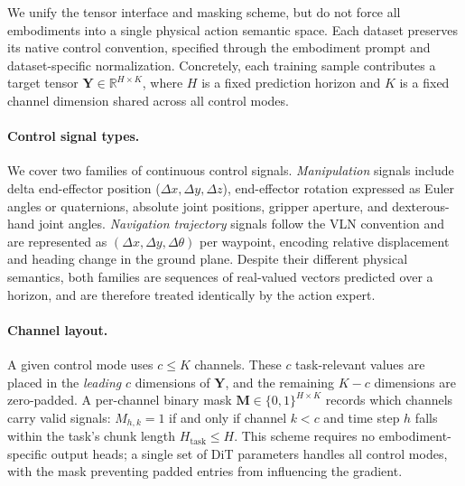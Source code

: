 We unify the tensor interface and masking scheme, but do not force all embodiments into a single physical action semantic space. Each dataset preserves its native control convention, specified through the embodiment prompt and dataset-specific normalization.
Concretely, each training sample contributes a target tensor $\mathbf{Y} \in \mathbb{R}^{H \times K}$, where $H$ is a fixed prediction horizon and $K$ is a fixed channel dimension shared across all control modes.


\paragraph{Control signal types.}
We cover two families of continuous control signals.
\textit{Manipulation} signals include delta end-effector position ($\Delta x, \Delta y, \Delta z$), end-effector rotation expressed as Euler angles or quaternions, absolute joint positions, gripper aperture, and dexterous-hand joint angles.
\textit{Navigation trajectory} signals follow the VLN convention and are represented as $(\Delta x, \Delta y, \Delta\theta)$ per waypoint, encoding relative displacement and heading change in the ground plane.
Despite their different physical semantics, both families are sequences of real-valued vectors predicted over a horizon, and are therefore treated identically by the action expert.

\paragraph{Channel layout.}
\label{sec:unified_rep:channel_mask}
A given control mode uses $c \leq K$ channels.
These $c$ task-relevant values are placed in the \emph{leading} $c$ dimensions of $\mathbf{Y}$, and the remaining $K - c$ dimensions are zero-padded.
A per-channel binary mask $\mathbf{M} \in \{0,1\}^{H \times K}$ records which channels carry valid signals: $M_{h,k} = 1$ if and only if channel $k < c$ and time step $h$ falls within the task's chunk length $H_{\text{task}} \leq H$.
This scheme requires no embodiment-specific output heads; a single set of DiT parameters handles all control modes, with the mask preventing padded entries from influencing the gradient.

